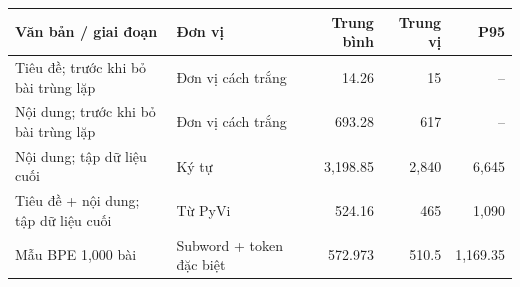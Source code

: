\begin{tabularx}{\linewidth}{>{\raggedright\arraybackslash}Xlrrr}\toprule Văn bản / giai đoạn & Đơn vị & Trung bình & Trung vị & P95\\\midrule
Tiêu đề; trước khi bỏ bài trùng lặp & Đơn vị cách trắng & 14.26 & 15 & --\\
Nội dung; trước khi bỏ bài trùng lặp & Đơn vị cách trắng & 693.28 & 617 & --\\
Nội dung; tập dữ liệu cuối & Ký tự & 3,198.85 & 2,840 & 6,645\\
Tiêu đề + nội dung; tập dữ liệu cuối & Từ PyVi & 524.16 & 465 & 1,090\\
Mẫu BPE 1,000 bài & Subword + token đặc biệt & 572.973 & 510.5 & 1,169.35\\\bottomrule\end{tabularx}

